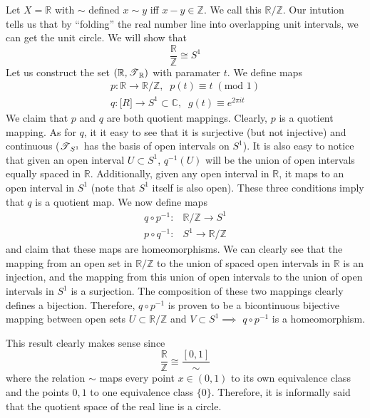     \begin{example}
      Let $X = \mathbb{R}$ with $\sim$ defined $x \sim y$ iff $x - y \in \mathbb{Z}$. We call this $\mathbb{R}/\mathbb{Z}$. Our intution tells us that by ``folding'' the real number line into overlapping unit intervals, we can get the unit circle. We will show that
      \begin{equation}
        \frac{\mathbb{R}}{\mathbb{Z}} \cong S^1
      \end{equation}
      Let us construct the set $(\mathbb{R}, \T_{\mathbb{R}})$ with paramater $t$. We define maps
      \begin{align*}
        p: \mathbb{R} \rightarrow \mathbb{R} / \mathbb{Z}, \;\; p(t) \equiv t \; (\text{mod } 1) \\
        q: \mathbb[R] \rightarrow S^1 \subset \mathbb{C}, \;\; g(t) \equiv e^{2 \pi i t} 
      \end{align*}
      We claim that $p$ and $q$ are both quotient mappings. Clearly, $p$ is a quotient mapping. As for $q$, it it easy to see that it is surjective (but not injective) and continuous ($\T_{S^1}$ has the basis of open intervals on $S^1$). It is also easy to notice that given an open interval $U \subset S^1$, $q^{-1}(U)$ will be the union of open intervals equally spaced in $\mathbb{R}$. Additionally, given any open interval in $\mathbb{R}$, it maps to an open interval in $S^1$ (note that $S^1$ itself is also open). These three conditions imply that $q$ is a quotient map. We now define maps 
      \begin{align}
        q \circ p^{-1}: & \mathbb{R} / \mathbb{Z} \rightarrow S^1 \\
        p \circ q^{-1}: & S^1 \rightarrow \mathbb{R} / \mathbb{Z}
      \end{align}
      and claim that these maps are homeomorphisms. We can clearly see that the mapping from an open set in $\mathbb{R} / \mathbb{Z}$ to the union of spaced open intervals in $\mathbb{R}$ is an injection, and the mapping from this union of open intervals to the union of open intervals in $S^1$ is a surjection. The composition of these two mappings clearly defines a bijection. Therefore, $q \circ p^{-1}$ is proven to be a bicontinuous bijective mapping between open sets $U \subset \mathbb{R} / \mathbb{Z}$ and $V \subset S^1 \implies$ $q \circ p^{-1}$ is a homeomorphism. 

      This result clearly makes sense since 
      \begin{equation}
        \frac{\mathbb{R}}{\mathbb{Z}} \cong \frac{[0,1]}{\sim}
      \end{equation}
      where the relation $\sim$ maps every point $x \in (0,1)$ to its own equivalence class and the points $0, 1$ to one equivalence class $\{0\}$. Therefore, it is informally said that the quotient space of the real line is a circle. 


\end{example}
